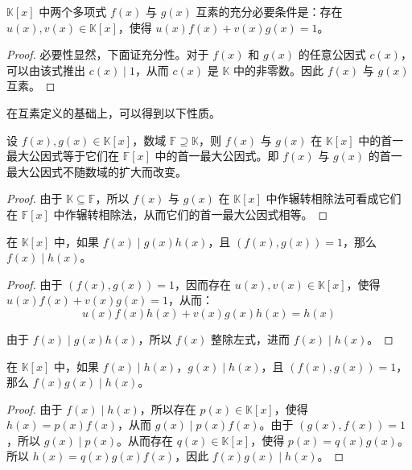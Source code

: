 \begin{theorem}[互素的充分必要条件]
	$\mathbb K[x]$ 中两个多项式 $f(x)$ 与 $g(x)$ 互素的充分必要条件是：存在 $u(x), v(x) \in \mathbb K[x]$，使得 $u(x) f(x) + v(x) g(x) = 1$。
\end{theorem}

\begin{proof}
	必要性显然，下面证充分性。对于 $f(x)$ 和 $g(x)$ 的任意公因式 $c(x)$，可以由该式推出 $c(x) \mid 1$，从而 $c(x)$ 是 $\mathbb K$ 中的非零数。因此 $f(x)$ 与 $g(x)$ 互素。
\end{proof}

在互素定义的基础上，可以得到以下性质。

\begin{proposition}
	设 $f(x), g(x) \in \mathbb K[x]$，数域 $\mathbb F \supseteq \mathbb K$，则 $f(x)$ 与 $g(x)$ 在 $\mathbb K[x]$ 中的首一最大公因式等于它们在 $\mathbb F[x]$ 中的首一最大公因式。即 $f(x)$ 与 $g(x)$ 的首一最大公因式不随数域的扩大而改变。
\end{proposition}

\begin{proof}
	由于 $\mathbb K \subseteq \mathbb F$，所以 $f(x)$ 与 $g(x)$ 在 $\mathbb K[x]$ 中作辗转相除法可看成它们在 $\mathbb F[x]$ 中作辗转相除法，从而它们的首一最大公因式相等。
\end{proof}

\begin{proposition}
	在 $\mathbb K[x]$ 中，如果 $f(x) \mid g(x) h(x)$，且 $(f(x), g(x)) = 1$，那么 $f(x) \mid h(x)$。
\end{proposition}

\begin{proof}
	由于 $(f(x), g(x)) = 1$，因而存在 $u(x), v(x) \in \mathbb K[x]$，使得 $u(x) f(x) + v(x) g(x) = 1$，从而：
	$$
	u(x) f(x) h(x) + v(x) g(x) h(x) = h(x)
	$$

	由于 $f(x) \mid g(x) h(x)$，所以 $f(x)$ 整除左式，进而 $f(x) \mid h(x)$。
\end{proof}

\begin{proposition}
	在 $\mathbb K[x]$ 中，如果 $f(x) \mid h(x)$，$g(x) \mid h(x)$，且 $(f(x), g(x)) = 1$，那么 $f(x) g(x) \mid h(x)$。
\end{proposition}

\begin{proof}
	由于 $f(x) \mid h(x)$，所以存在 $p(x) \in \mathbb K[x]$，使得 $h(x) = p(x) f(x)$，从而 $g(x) \mid p(x) f(x)$。由于 $(g(x), f(x)) = 1$，所以 $g(x) \mid p(x)$。从而存在 $q(x) \in \mathbb K[x]$，使得 $p(x) = q(x) g(x)$。所以 $h(x) = q(x) g(x) f(x)$，因此 $f(x) g(x) \mid h(x)$。
\end{proof}

